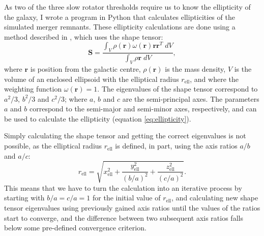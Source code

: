 \documentclass[english, twoside]{HYgradu}
\begin{document}
As two of the three slow rotator thresholds require us to know the ellipticity of the galaxy, I wrote a program in Python that calculates ellipticities of the simulated merger remnants. These ellipticity calculations are done using a method described in \cite{Zemp2011}, which uses the shape tensor:
\begin{equation}
\mathbf{S} = \frac{\int_V \rho(\mathbf{r}) \omega(\mathbf{r}) \mathbf{r} \mathbf{r}^T \; dV }{\int_V \rho{\mathbf{r}} \; dV},
\end{equation}
where $\mathbf{r}$ is position from the galactic centre, $\rho(\mathbf{r})$ is the mass density, $V$ is the volume of an enclosed ellipsoid with the elliptical radius $r_\mathrm{ell}$, and where the weighting function $\omega(\mathbf{r}) = 1$. The eigenvalues of the shape tensor correspond to $a^2/3$, $b^2/3$ and $c^2/3$; where $a$, $b$ and $c$ are the semi-principal axes. The parameters $a$ and $b$ correspond to the semi-major and semi-minor axes, respectively, and can be used to calculate the ellipticity (equation \ref{eq:ellipticity}). 

Simply calculating the shape tensor and getting the correct eigenvalues is not possible, as the elliptical radius $r_\mathrm{ell}$ is defined, in part, using the axis ratios $a/b$ and $a/c$:
\begin{equation}
r_\mathrm{ell} = \sqrt{x_\mathrm{ell}^2 + \frac{y_\mathrm{ell}^2}{(b/a)^2} + \frac{z_\mathrm{ell}^2}{(c/a)^2}}.
\end{equation}
This means that we have to turn the calculation into an iterative process by starting with $b/a = c/a = 1$ for the initial value of $r_\mathrm{ell}$, and calculating new shape tensor eigenvalues using previously gained axis ratios until the values of the ratios start to converge, and the difference between two subsequent axis ratios falls below some pre-defined convergence criterion.
\end{document}
